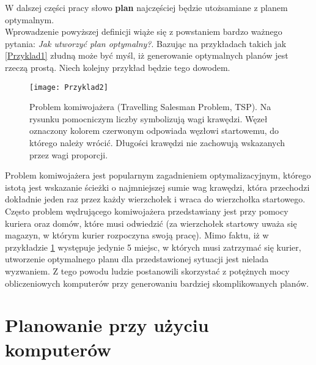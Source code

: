     W dalszej części pracy słowo \textbf{plan} najczęściej będzie utożsamiane z planem optymalnym. \\
    Wprowadzenie powyższej definicji wiąże się z powstaniem bardzo ważnego pytania: \textit{Jak utworzyć plan optymalny?}. Bazując na przykładach
    takich jak \ref{Przyklad1} złudną może być myśl, iż generowanie optymalnych planów jest rzeczą prostą. Niech kolejny przykład będzie tego
    dowodem.
    \begin{figure}[H]
        \texttt{[image: Przyklad2]}
        \centering
        \caption{Problem komiwojażera (Travelling Salesman Problem, TSP). Na rysunku pomocniczym liczby symbolizują wagi krawędzi. Węzeł oznaczony
        kolorem czerwonym odpowiada węzłowi startowemu, do którego należy wrócić. Długości krawędzi nie zachowują wskazanych przez wagi proporcji.}
        \label{TSP}
    \end{figure}
    Problem komiwojażera jest popularnym zagadnieniem optymalizacyjnym, którego istotą jest wskazanie ścieżki o najmniejszej sumie wag krawędzi, 
    która przechodzi dokładnie jeden raz przez każdy wierzchołek i wraca do wierzchołka startowego. Często problem wędrującego 
    komiwojażera przedstawiany jest przy pomocy kuriera oraz domów, które musi odwiedzić (za wierzchołek startowy uważa się magazyn,
    w którym kurier rozpoczyna swoją pracę). Mimo faktu, iż w przykładzie \ref{TSP} występuje jedynie 5 miejsc, 
    w których musi zatrzymać się kurier, utworzenie optymalnego planu dla przedstawionej sytuacji jest nielada wyzwaniem. Z tego powodu 
    ludzie postanowili skorzystać z potężnych mocy obliczeniowych komputerów przy generowaniu bardziej skomplikowanych planów.


\section{Planowanie przy użyciu komputerów}
